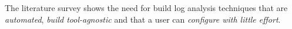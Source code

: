 The literature survey shows the need for
build log
analysis techniques that are \emph{automated},
\emph{build tool-agnostic}
and that a user can \emph{configure with little effort}.










